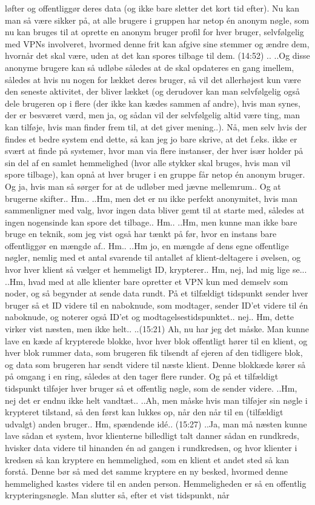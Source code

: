 \documentclass{report}
\begin{document}
løfter og offentliggør deres data (og ikke bare sletter det kort tid efter). Nu kan man så være sikker på, at alle brugere i gruppen har netop én anonym nøgle, som nu kan bruges til at oprette en anonym bruger profil for hver bruger, selvfølgelig med VPNs involveret, hvormed denne frit kan afgive sine stemmer og ændre dem, hvornår det skal være, uden at det kan spores tilbage til dem. (14:52) .. ..Og disse anonyme brugere kan så udløbe således at de skal opdateres en gang imellem, således at hvis nu nogen for lækket deres bruger, så vil det allerhøjest kun være den seneste aktivitet, der bliver lækket (og derudover kan man selvfølgelig også dele brugeren op i flere (der ikke kan kædes sammen af andre), hvis man synes, der er besværet værd, men ja, og sådan vil der selvfølgelig altid være ting, man kan tilføje, hvis man finder frem til, at det giver mening..). Nå, men selv hvis der findes et bedre system end dette, så kan jeg jo bare skrive, at det f.eks. ikke er svært at finde på systemer, hvor man via flere instanser, der hver især holder på sin del af en samlet hemmelighed (hvor alle stykker skal bruges, hvis man vil spore tilbage), kan opnå at hver bruger i en gruppe får netop én anonym bruger. Og ja, hvis man så sørger for at de udløber med jævne mellemrum.. Og at brugerne skifter.. Hm.. ..Hm, men det er nu ikke perfekt anonymitet, hvis man sammenligner med valg, hvor ingen data bliver gemt til at starte med, således at ingen nogensinde kan spore det tilbage.. Hm.. ..Hm, men kunne man ikke bare bruge en teknik, som jeg vist også har tænkt på før, hvor en instans bare offentliggør en mængde af.. Hm.. ..Hm jo, en mængde af dens egne offentlige nøgler, nemlig med et antal svarende til antallet af klient-deltagere i øvelsen, og hvor hver klient så vælger et hemmeligt ID, krypterer.. Hm, nej, lad mig lige se... ..Hm, hvad med at alle klienter bare opretter et VPN kun med demselv som noder, og så begynder at sende data rundt. På et tilfældigt tidspunkt sender hver bruger så et ID videre til en naboknude, som modtager, sender ID'et videre til én naboknude, og noterer også ID'et og modtagelsestidspunktet.. nej.. Hm, dette virker vist næsten, men ikke helt.. ..(15:21) Ah, nu har jeg det måske. Man kunne lave en kæde af krypterede blokke, hvor hver blok offentligt hører til en klient, og hver blok rummer data, som brugeren fik tilsendt af ejeren af den tidligere blok, og data som brugeren har sendt videre til næste klient. Denne blokkæde kører så på omgang i en ring, således at den tager flere runder. Og på et tilfældigt tidspunkt tilføjer hver bruger så et offentlig nøgle, som de sender videre. ..Hm, nej det er endnu ikke helt vandtæt.. ..Ah, men måske hvis man tilføjer sin nøgle i krypteret tilstand, så den først kan lukkes op, når den når til en (tilfældigt udvalgt) anden bruger.. Hm, spændende idé.. (15:27) ..Ja, man må næsten kunne lave sådan et system, hvor klienterne billedligt talt danner sådan en rundkreds, hvisker data videre til hinanden én ad gangen i rundkredsen, og hvor klienter i kredsen så kan kryptere en hemmelighed, som en klient et andet sted så kan forstå. Denne bør så med det samme kryptere en ny besked, hvormed denne hemmelighed kastes videre til en anden person. Hemmeligheden er så en offentlig krypteringsnøgle. Man slutter så, efter et vist tidspunkt, når 
\end{document}
